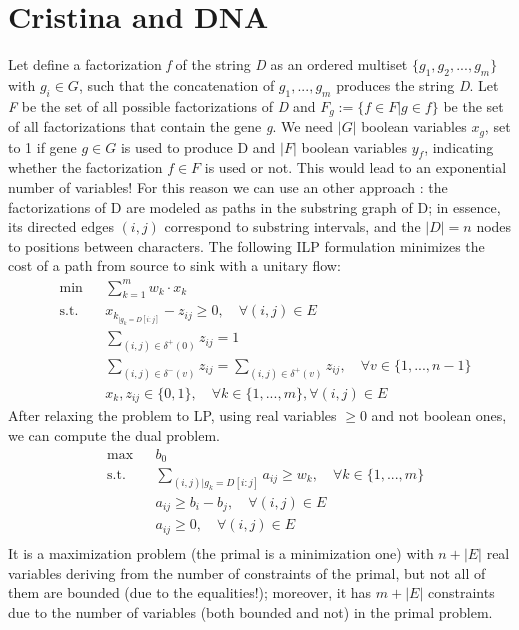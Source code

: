 \section{Cristina and DNA}
Let define a factorization \textit{f} of the string \textit{D} as an ordered multiset $\{g_1, g_2, ..., g_m\}$ with $g_i \in G$, such that the concatenation of $g_1, ..., g_m$ produces the string \textit{D}. Let \textit{F} be the set of all possible factorizations of \textit{D} and $F_g:= \{f \in F | g \in f\}$ be the set of all factorizations that contain the gene \textit{g}. We need $|G|$ boolean variables $x_g$, set to 1 if gene $g \in G$ is used to produce D and $|F|$ boolean variables $y_f$, indicating whether the factorization $f \in F$ is used or not. This would lead to an exponential number of variables! For this reason we can use an other approach \cite{Chris}: the factorizations of D are modeled as paths in the substring graph of D; in essence, its directed edges $(i,j)$ correspond to substring intervals, and the $|D| = n$ nodes to positions between characters. The following ILP formulation minimizes the cost of a path from source to sink with a unitary flow:
\begin{align*}
&\text{min} && \sum_{k=1}^{m} w_k \cdot x_k \\
&\text{s.t.} && x_{k_{|g_k = D[i:j]}} -z_{ij} \geq 0, \quad \forall (i,j) \in E\\
&&& \sum_{(i,j) \in \delta^+(0)} z_{ij} = 1 \\
&&& \sum_{(i,j) \in \delta^-(v)} z_{ij} = \sum_{(i,j) \in \delta^+(v)} z_{ij}, \quad \forall v \in \{1,..., n-1 \} \\
&&& x_k, z_{ij} \in \{0, 1\}, \quad \forall k \in \{1, ..., m\}, \forall (i,j) \in E
\end{align*}
After relaxing the problem to LP, using real variables $\geq 0$ and not boolean ones, we can compute the dual problem.
\begin{align*}
&\text{max} && b_0 \\
&\text{s.t.} && \sum_{(i,j) | g_k = D[i:j]} a_{ij} \geq w_k, \quad \forall k \in \{1,...,m\}\\
&&& a_{ij} \geq b_i - b_j, \quad \forall (i,j) \in E \\
&&& a_{ij} \geq 0, \quad \forall (i,j) \in E \\
\end{align*}
It is a maximization problem (the primal is a minimization one) with $n + |E|$ real variables deriving from the number of constraints of the primal, but not all of them are bounded (due to the equalities!); moreover, it has $m + |E|$ constraints due to the number of variables (both bounded and not) in the primal problem.
